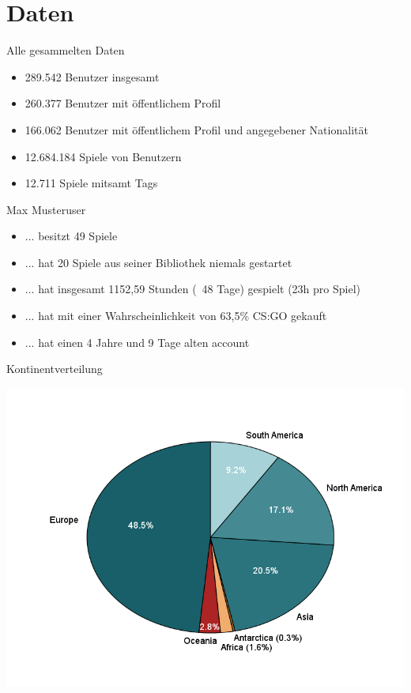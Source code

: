 \documentclass[12pt]{beamer}
\begin{document}
\section{Daten}
\begin{frame}{Alle gesammelten Daten}
	\begin{itemize}
		\item 289.542 Benutzer insgesamt
		\item 260.377  Benutzer mit öffentlichem Profil
		\item 166.062 Benutzer mit öffentlichem Profil und angegebener Nationalität
		
		\item 12.684.184 Spiele von Benutzern
		\item 12.711 Spiele mitsamt Tags
	\end{itemize}
\end{frame}

\begin{frame}{Max Musteruser}

	\begin{itemize}
	\item ... besitzt 49 Spiele
	\item ... hat 20 Spiele aus seiner Bibliothek niemals gestartet
	\item ... hat insgesamt 1152,59 Stunden (~48 Tage) gespielt (23h pro Spiel)
	\item ... hat mit einer Wahrscheinlichkeit von 63,5\%  CS:GO gekauft
	\item ... hat einen 4 Jahre und 9 Tage alten account
	\end{itemize}
\end{frame}

\begin{frame}{Kontinentverteilung}
	\centerline{\includegraphics[scale=0.53]{img/continents.png}}
\end{frame}
\end{document}
